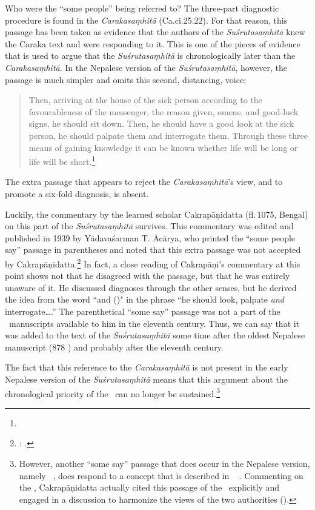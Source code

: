 Who were the “some people” being referred to? The three-part
diagnostic procedure is found in the \emph{Carakasaṃhitā}
(Ca.ci.25.22). For that reason, this passage has been taken as
evidence that the authors of the \emph{Suśrutasaṃhitā} knew the Caraka text
and were responding to it. This is one of the pieces of evidence that
is used to argue that the \emph{Suśrutasaṃhitā} is chronologically
later than the \emph{Carakasaṃhitā}. In the Nepalese version of the
\emph{Suśrutasaṃhitā}, however, the passage is much simpler and omits
this second, distancing, voice:
\begin{quote}
    Then, arriving at the house of the sick person according to the favourableness of 
the messenger, the reason given, omens, and good-luck signs, he should sit down. 
Then, he should have a good look at the sick person, he should palpate them and 
interrogate them. Through these three means of gaining knowledge it can be 
known whether life will be long or life will be short.\footnote{}
\end{quote}
The extra passage that appears to reject the \emph{Carakasaṃhitā}'s view, and to promote a six-fold diagnosis, is absent.

Luckily, the commentary by the learned scholar Cakrapāṇidatta
(fl.\,1075, Bengal) on this part of the \emph{Suśrutasaṃhitā}
survives. This commentary was edited and published in 1939 by
Yādavaśarman T. Ācārya, who printed the “some people say” passage in
parentheses and noted that this extra passage was not accepted by
Cakrapāṇidatta.\footnote{\cite[77, n.\,2]{acar-1939}: . }  In fact, a close reading of Cakrapāṇi's commentary at
    this point shows not that he disagreed with the passage, but that he
    was entirely unaware of it.  He discussed diagnoses through the other
    senses, but he derived the idea from the word “and ()" in the
    phrase “he should look, palpate \textit{and} interrogate\ldots.”  The
    parenthetical “some say” passage was not a part of the \SS\
    manuscripts available to him in the eleventh century.  Thus, we can
    say that it was added to the text of the \emph{Suśrutasaṃhitā} some
    time after the oldest Nepalese manuscript (878 \CE) and
    probably after the eleventh century.

The fact that this reference to the \emph{Carakasaṃhitā} is not
present in the early Nepalese version of the \emph{Suśrutasaṃhitā}
means that this argument about the chronological priority of the \CS\
can no longer be sustained.\footnote{However, another 
    “some say” passage that does occur in the Nepalese version, namely \SS\
    , does respond to a concept that is described in 
    \CS\ \Ca{6.29.19}{628} \citep[101]{emme-1984}.  Commenting on the
    \CS, Cakrapāṇidatta actually cited this passage of the \SS\ explicitly and 
    engaged in a discussion to harmonize the views of the two authorities 
    (\dev{tena na virodhaścarakasuśrutayoḥ/}).}

